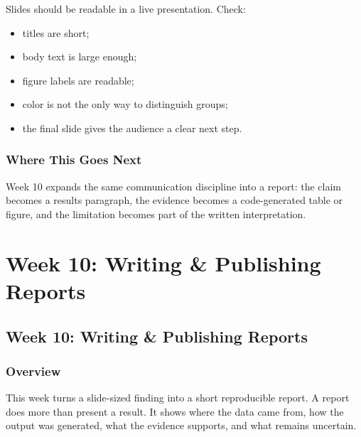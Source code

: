 \documentclass[
  letterpaper,
  DIV=11,
  numbers=noendperiod,
  oneside]{scrreprt}
\providecommand{\tightlist}{%
  \setlength{\itemsep}{0pt}\setlength{\parskip}{0pt}}
\begin{document}

Slides should be readable in a live presentation. Check:

\begin{itemize}
\tightlist
\item
  titles are short;
\item
  body text is large enough;
\item
  figure labels are readable;
\item
  color is not the only way to distinguish groups;
\item
  the final slide gives the audience a clear next step.
\end{itemize}

\section*{Where This Goes Next}\label{where-this-goes-next-21}


Week 10 expands the same communication discipline into a report: the
claim becomes a results paragraph, the evidence becomes a code-generated
table or figure, and the limitation becomes part of the written
interpretation.

\part{Week 10: Writing \& Publishing Reports}

\chapter*{Week 10: Writing \& Publishing
Reports}\label{week-10-writing-publishing-reports-1}


\section*{Overview}\label{overview-9}


This week turns a slide-sized finding into a short reproducible report.
A report does more than present a result. It shows where the data came
from, how the output was generated, what the evidence supports, and what
remains uncertain.
\end{document}
